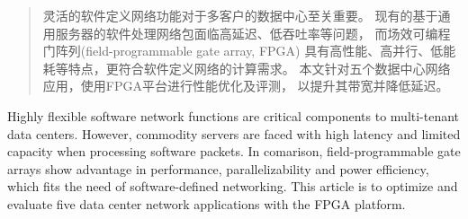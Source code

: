 ﻿\begin{abstract}
  灵活的软件定义网络功能对于多客户的数据中心至关重要。
  现有的基于通用服务器的软件处理网络包面临高延迟、低吞吐率等问题，
  而场效可编程门阵列(field-programmable gate array, FPGA)
  具有高性能、高并行、低能耗等特点，更符合软件定义网络的计算需求。
  本文针对五个数据中心网络应用，使用FPGA平台进行性能优化及评测，
  以提升其带宽并降低延迟。

\end{abstract}

\begin{enabstract}
  Highly flexible software network functions are critical components to multi-tenant data centers.
  However, commodity servers are faced with high latency and limited capacity when processing software packets.
  In comarison, field-programmable gate arrays show advantage in performance, parallelizability and power efficiency,
  which fits the need of software-defined networking.
  This article is to optimize and evaluate five data center network applications with the FPGA platform.
\end{enabstract}
